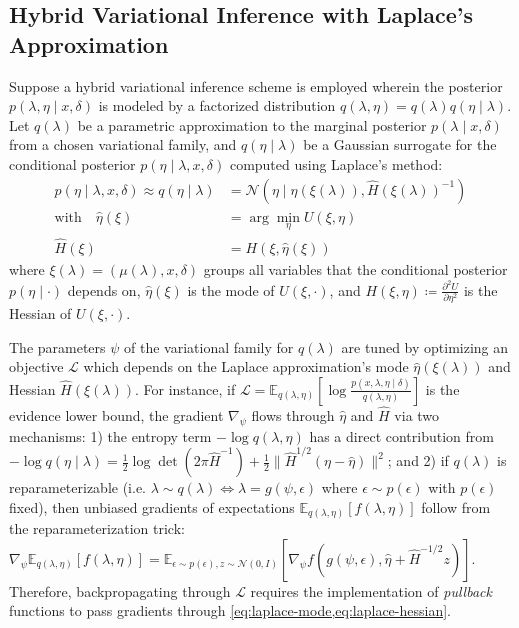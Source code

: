 \documentclass{article}
\begin{document}
\subsection{Hybrid Variational Inference with Laplace's Approximation}

Suppose a hybrid variational inference scheme is employed wherein the posterior $p(\lambda, \eta \mid x, \delta)$ is modeled by a factorized distribution $q(\lambda, \eta) = q(\lambda) q(\eta \mid \lambda)$.
Let $q(\lambda)$ be a parametric approximation to the marginal posterior $p(\lambda \mid x, \delta)$ from a chosen variational family, and $q(\eta \mid \lambda)$ be a Gaussian surrogate for the conditional posterior $p(\eta \mid \lambda, x, \delta)$ computed using Laplace's method:
%
\begin{align}
  p(\eta \mid \lambda, x, \delta) \approx q(\eta \mid \lambda) & = \mathcal{N}(\eta \mid \hat{\eta}(\xi(\lambda)), \hat{H}(\xi(\lambda))^{-1}) \\
  \text{with} \quad
  \hat{\eta}(\xi)                                              & = \arg\min_{\eta} U(\xi, \eta) \label{eq:laplace-mode}                        \\
  \hat{H}(\xi)                                                 & = H(\xi, \hat{\eta}(\xi)) \label{eq:laplace-hessian}
\end{align}
%
where $\xi(\lambda) = (\mu(\lambda), x, \delta)$ groups all variables that the conditional posterior $p(\eta \mid \cdot)$ depends on, $\hat{\eta}(\xi)$ is the mode of $U(\xi, \cdot)$, and $H(\xi, \eta) \coloneqq \frac{\partial^2 U}{\partial \eta^2}$ is the Hessian of $U(\xi, \cdot)$.

The parameters $\psi$ of the variational family for $q(\lambda)$ are tuned by optimizing an objective $\mathcal{L}$ which depends on the Laplace approximation's mode $\hat{\eta}(\xi(\lambda))$ and Hessian $\hat{H}(\xi(\lambda))$.
For instance, if $\mathcal{L} = \mathbb{E}_{q(\lambda, \eta)} \left[\log \frac{p(x, \lambda, \eta \mid \delta)}{q(\lambda, \eta)}\right]$ is the evidence lower bound, the gradient $\nabla_\psi$ flows through $\hat{\eta}$ and $\hat{H}$ via two mechanisms:
1) the entropy term $-\log q(\lambda, \eta)$ has a direct contribution from $-\log q(\eta \mid \lambda) = \tfrac{1}{2}\log\det(2\pi\hat{H}^{-1}) + \tfrac{1}{2} \lVert \hat{H}^{1/2} (\eta - \hat{\eta}) \rVert^2$;
and 2) if $q(\lambda)$ is reparameterizable (i.e. $\lambda \sim q(\lambda) \Leftrightarrow \lambda = g(\psi, \epsilon)$ where $\epsilon \sim p(\epsilon)$ with $p(\epsilon)$ fixed), then unbiased gradients of expectations $\mathbb{E}_{q(\lambda, \eta)}[f(\lambda, \eta)]$ follow from the reparameterization trick:
$\nabla_\psi \mathbb{E}_{q(\lambda, \eta)}[f(\lambda, \eta)] = \mathbb{E}_{\epsilon \sim p(\epsilon), z \sim \mathcal{N}(0, I)}[\nabla_\psi f(g(\psi, \epsilon), \hat{\eta} + \hat{H}^{-1/2} z)]$.
Therefore, backpropagating through $\mathcal{L}$ requires the implementation of \textit{pullback} functions to pass gradients through \cref{eq:laplace-mode,eq:laplace-hessian}.
\end{document}
